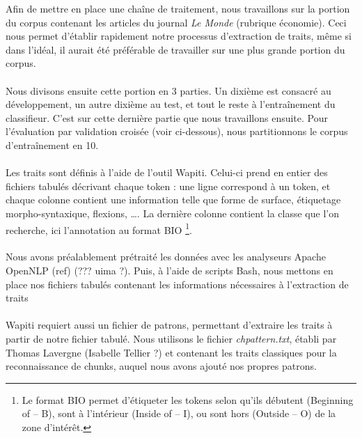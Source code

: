 \documentclass[a4paper,12pt]{article}
\begin{document}

Afin de mettre en place une chaîne de traitement, nous travaillons sur la portion du corpus contenant les articles du journal \emph{Le Monde} (rubrique économie). Ceci nous permet d'établir rapidement notre processus d'extraction de traits, même si dans l'idéal, il aurait été préférable de travailler sur une plus grande portion du corpus.

\paragraph{}
Nous divisons ensuite cette portion en 3 parties. Un dixième est consacré au développement, un autre dixième au test, et tout le reste à l'entraînement du classifieur. C'est sur cette dernière partie que nous travaillons ensuite. Pour l'évaluation par validation croisée (voir ci-dessous), nous partitionnons le corpus d'entraînement en 10.

\paragraph{}
Les traits sont définis à l'aide de l'outil Wapiti. Celui-ci prend en entier des fichiers tabulés décrivant chaque token : une ligne correspond à un token, et chaque colonne contient une information telle que forme de surface, étiquetage morpho-syntaxique, flexions, \ldots. La dernière colonne contient la classe que l'on recherche, ici l'annotation au format BIO \footnote{Le format BIO permet d'étiqueter les tokens selon qu'ils débutent (Beginning of -- B), sont à l'intérieur (Inside of -- I), ou sont hors (Outside -- O) de la zone d'intérêt.}.

\paragraph{}
Nous avons préalablement prétraité les données avec les analyseurs Apache OpenNLP (ref) (??? uima ?). Puis, à l'aide de scripts Bash, nous mettons en place nos fichiers tabulés contenant les informations nécessaires à l'extraction de traits

\paragraph{}
Wapiti requiert aussi un fichier de patrons, permettant d'extraire les traits à partir de notre fichier tabulé. Nous utilisons le fichier \emph{chpattern.txt}, établi par Thomas Lavergne (Isabelle Tellier ?) et contenant les traits classiques pour la reconnaissance de chunks, auquel nous avons ajouté nos propres patrons.
\end{document}
